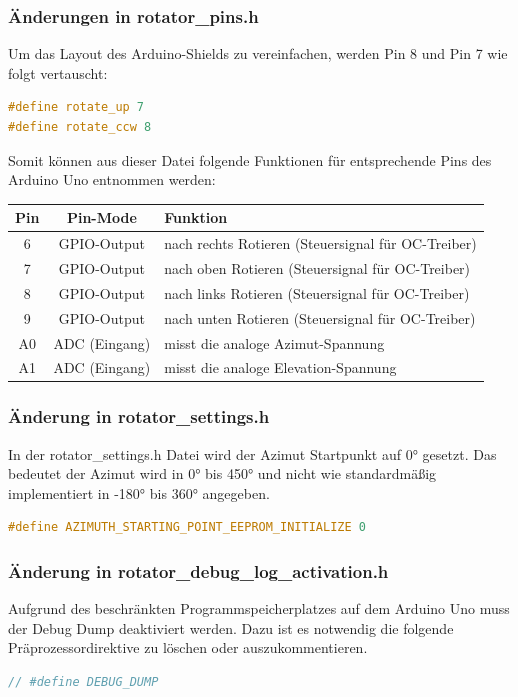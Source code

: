 \subsubsection{Änderungen in rotator\_pins.h}
Um das Layout des Arduino-Shields zu vereinfachen, werden Pin 8 und Pin 7 wie folgt vertauscht:
\begin{lstlisting}[language=C++]
#define rotate_up 7
#define rotate_ccw 8
\end{lstlisting}

Somit können aus dieser Datei folgende Funktionen für entsprechende Pins des Arduino Uno entnommen werden:

\begin{tabular}{| c | c | l |}
	\hline
	\textbf{Pin} & \textbf{Pin-Mode} & \textbf{Funktion} \\
	\hline
	6 & GPIO-Output & nach rechts Rotieren (Steuersignal für OC-Treiber) \\
	\hline
	7 & GPIO-Output & nach oben Rotieren (Steuersignal für OC-Treiber) \\
	\hline
	8 & GPIO-Output & nach links Rotieren (Steuersignal für OC-Treiber) \\
	\hline
	9 & GPIO-Output & nach unten Rotieren (Steuersignal für OC-Treiber) \\
	\hline
	A0 & ADC (Eingang) & misst die analoge Azimut-Spannung \\
	\hline
	A1 & ADC (Eingang) & misst die analoge Elevation-Spannung \\
	\hline
\end{tabular}

\subsubsection{Änderung in rotator\_settings.h}
In der rotator\_settings.h Datei wird der Azimut Startpunkt auf 0° gesetzt. Das bedeutet der Azimut wird in 0° bis 450° und nicht wie standardmäßig implementiert in -180° bis 360° angegeben.
\begin{lstlisting}[language=C++]
#define AZIMUTH_STARTING_POINT_EEPROM_INITIALIZE 0
\end{lstlisting}

\subsubsection{Änderung in rotator\_debug\_log\_activation.h}
Aufgrund des beschränkten Programmspeicherplatzes auf dem Arduino Uno muss der Debug Dump deaktiviert werden. Dazu ist es notwendig die folgende Präprozessordirektive zu löschen oder auszukommentieren.
\begin{lstlisting}[language=C++]
// #define DEBUG_DUMP
\end{lstlisting}

